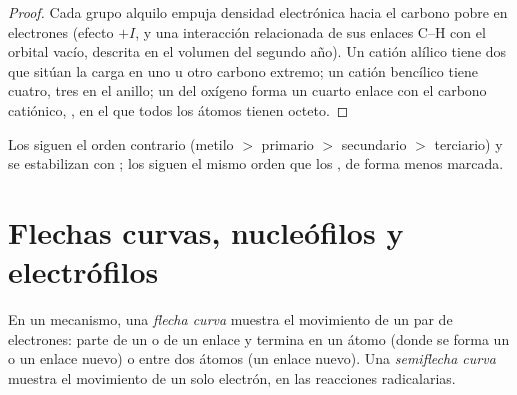 \begin{proof}
Cada grupo alquilo empuja densidad electrónica hacia el carbono pobre en
electrones (efecto $+I$, y una interacción relacionada de sus enlaces
C--H con el orbital vacío, descrita en el volumen del segundo año). Un
catión alílico tiene dos  que sitúan la carga en uno u
otro carbono extremo; un catión bencílico tiene cuatro, tres en el
anillo; un  del oxígeno forma un cuarto enlace con el
carbono catiónico, , en el que todos los átomos tienen
octeto.
\end{proof}

Los  siguen el orden contrario (metilo $>$ primario $>$
secundario $>$ terciario) y se estabilizan con ; los
 siguen el mismo orden que los , de forma menos
marcada.

\section{Flechas curvas, nucleófilos y electrófilos}

\begin{definition}\label{def:b1:electronic-effects:curly-arrow}
En un mecanismo, una \emph{flecha curva} muestra el
movimiento de un par de electrones: parte de un  o de un
enlace y termina en un átomo (donde se forma un  o un
enlace nuevo) o entre dos átomos (un enlace nuevo). Una \emph{semiflecha
curva} muestra el movimiento de un solo electrón,
en las reacciones radicalarias.
\end{definition}

